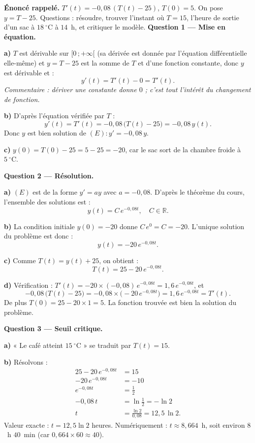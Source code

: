 \documentclass[11pt]{article}
\begin{document}
\begin{exoresolu}
\textbf{Énoncé rappelé.} $T'(t) = -0{,}08\,(T(t) - 25)$, $T(0) = 5$. On pose $y = T - 25$. Questions : résoudre, trouver l'instant où $T = 15$, l'heure de sortie d'un sac à $18~^\circ\mathrm{C}$ à $14$~h, et critiquer le modèle.
\tcblower
\textbf{Question 1 — Mise en équation.}

\textbf{a)} $T$ est dérivable sur $[0\,; +\infty[$ (sa dérivée est donnée par l'équation différentielle elle-même) et $y = T - 25$ est la somme de $T$ et d'une fonction constante, donc $y$ est dérivable et :
\[ y'(t) = T'(t) - 0 = T'(t). \]
\emph{Commentaire : dériver une constante donne $0$ ; c'est tout l'intérêt du changement de fonction.}

\textbf{b)} D'après l'équation vérifiée par $T$ :
\[ y'(t) = T'(t) = -0{,}08\,\big(T(t) - 25\big) = -0{,}08\,y(t). \]
Donc $y$ est bien solution de $(E) : y' = -0{,}08\,y$.

\textbf{c)} $y(0) = T(0) - 25 = 5 - 25 = -20$, car le sac sort de la chambre froide à $5~^\circ\mathrm{C}$.

\textbf{Question 2 — Résolution.}

\textbf{a)} $(E)$ est de la forme $y' = ay$ avec $a = -0{,}08$. D'après le théorème du cours, l'ensemble des solutions est :
\[ y(t) = C\,e^{-0{,}08t}, \quad C \in \mathbb{R}. \]

\textbf{b)} La condition initiale $y(0) = -20$ donne $C\,e^{0} = C = -20$. L'unique solution du problème est donc :
\[ y(t) = -20\,e^{-0{,}08t}. \]

\textbf{c)} Comme $T(t) = y(t) + 25$, on obtient :
\[ \boxed{T(t) = 25 - 20\,e^{-0{,}08t}}. \]

\textbf{d)} Vérification : $T'(t) = -20 \times (-0{,}08)\,e^{-0{,}08t} = 1{,}6\,e^{-0{,}08t}$, et
\[ -0{,}08\,\big(T(t) - 25\big) = -0{,}08 \times \big(-20\,e^{-0{,}08t}\big) = 1{,}6\,e^{-0{,}08t} = T'(t). \]
De plus $T(0) = 25 - 20 \times 1 = 5$. La fonction trouvée est bien la solution du problème.

\textbf{Question 3 — Seuil critique.}

\textbf{a)} « Le café atteint $15~^\circ\mathrm{C}$ » se traduit par $T(t) = 15$.

\textbf{b)} Résolvons :
\begin{align*}
25 - 20\,e^{-0{,}08t} &= 15 \\
-20\,e^{-0{,}08t} &= -10 \\
e^{-0{,}08t} &= \frac{1}{2} \\
-0{,}08\,t &= \ln\frac{1}{2} = -\ln 2 \\
t &= \frac{\ln 2}{0{,}08} = 12{,}5\,\ln 2.
\end{align*}
Valeur exacte : $t = 12{,}5\ln 2$ heures. Numériquement : $t \approx 8{,}664$~h, soit environ $8$~h $40$~min (car $0{,}664 \times 60 \approx 40$).


\end{exoresolu}
\end{document}
